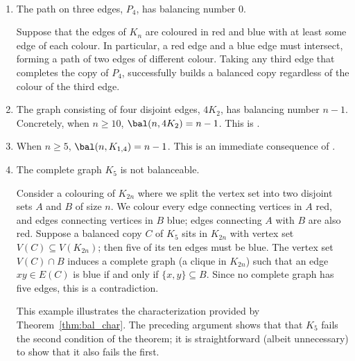 \begin{example}\label{ex:balancing_numbers}~ 
\begin{enumerate}
    \item The path on three edges, $P_4$, has balancing number $0$.
    
    Suppose that the edges of $K_n$ are coloured in red and blue with at least some edge of each colour.
    In particular, a red edge and a blue edge must intersect, forming a path of two edges of different colour.
    Taking any third edge that completes the copy of $P_4$, successfully builds a balanced copy regardless of the colour of the third edge.
    
    \item The graph consisting of four disjoint edges, $4K_2$, has balancing number $n-1$.
    Concretely, when $n\geq 10$, $\bal(n,4K_2)=n-1$.
    This is \cite[Theorem~2.3]{Caro_small_balanceable}.

    \item When $n\geq5$, $\bal(n,K_{1,4})=n-1$.
    This is an immediate consequence of \cite[Theorem~3.2]{unavoidable_chromatic}.

    \item The complete graph $K_5$ is not balanceable.
    
    Consider a colouring of $K_{2n}$ where we split the vertex set into two disjoint sets $A$ and $B$ of size $n$.
    We colour every edge connecting vertices in $A$ red, and edges connecting vertices in $B$ blue; edges connecting $A$ with $B$ are also red.
    Suppose a balanced copy $C$ of $K_5$ sits in $K_{2n}$ with vertex set $V(C)\subseteq V(K_{2n})$; then five of its ten edges must be blue.
    The vertex set $V(C)\cap B$ induces a complete graph (a clique in $K_{2n}$) such that an edge $xy\in E(C)$ is blue if and only if $\{x,y\}\subseteq B$.
    Since no complete graph has five edges, this is a contradiction.
    
    This example illustrates the characterization provided by Theorem~\ref{thm:bal_char}.
    The preceding argument shows that that $K_5$ fails the second condition of the theorem; it is straightforward (albeit unnecessary) to show that it also fails the first.
\end{enumerate}
\end{example}

